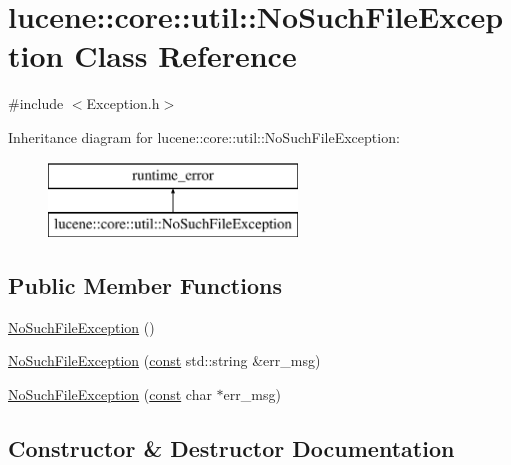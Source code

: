 \hypertarget{classlucene_1_1core_1_1util_1_1NoSuchFileException}{}\section{lucene\+:\+:core\+:\+:util\+:\+:No\+Such\+File\+Exception Class Reference}
\label{classlucene_1_1core_1_1util_1_1NoSuchFileException}


{\ttfamily \#include $<$Exception.\+h$>$}

Inheritance diagram for lucene\+:\+:core\+:\+:util\+:\+:No\+Such\+File\+Exception\+:\begin{figure}[H]
\begin{center}
\leavevmode
\includegraphics[height=2.000000cm]{classlucene_1_1core_1_1util_1_1NoSuchFileException}
\end{center}
\end{figure}
\subsection*{Public Member Functions}
\begin{DoxyCompactItemize}
\item 
\mbox{\hyperlink{classlucene_1_1core_1_1util_1_1NoSuchFileException_a1924067fec571efd5b5bb9a086385483}{No\+Such\+File\+Exception}} ()
\item 
\mbox{\hyperlink{classlucene_1_1core_1_1util_1_1NoSuchFileException_a413d592389fded7c3c6fdd78bd03867b}{No\+Such\+File\+Exception}} (\mbox{\hyperlink{ZlibCrc32_8h_a2c212835823e3c54a8ab6d95c652660e}{const}} std\+::string \&err\+\_\+msg)
\item 
\mbox{\hyperlink{classlucene_1_1core_1_1util_1_1NoSuchFileException_a6520445e0fd5ac3e9921bdb9142e82db}{No\+Such\+File\+Exception}} (\mbox{\hyperlink{ZlibCrc32_8h_a2c212835823e3c54a8ab6d95c652660e}{const}} char $\ast$err\+\_\+msg)
\end{DoxyCompactItemize}


\subsection{Constructor \& Destructor Documentation}
\mbox{\label{classlucene_1_1core_1_1util_1_1NoSuchFileException_a1924067fec571efd5b5bb9a086385483}} 
